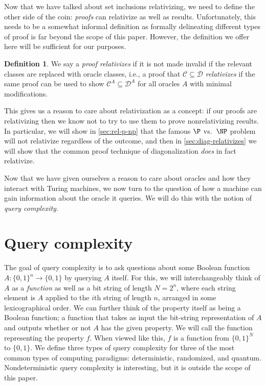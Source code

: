 \documentclass[english]{reedthesis}
\theoremstyle{plain}
\theoremstyle{definition}
\newtheorem{defn}[defn]{Definition}
\theoremstyle{remark}
\begin{document}
Now that we have talked about set inclusions relativizing, we need to define the
other side of the coin: \emph{proofs} can relativize as well as results.
Unfortunately, this needs to be a somewhat informal definition as formally
delineating different types of proof is far beyond the scope of this paper.
However, the definition we offer here will be sufficient for our purposes.

\begin{defn}\label{def:relativizing-result}
  We say a \emph{proof relativizes} if it is not made invalid if the relevant
  classes are replaced with oracle classes, i.e., a proof that $\mathcal{C} \subseteq \mathcal{D}$
  \emph{relativizes} if the same proof can be used to show $\mathcal{C}^{A} \subseteq \mathcal{D}^{A}$ for
  all oracles $A$ with minimal modifications.
\end{defn}

This gives us a reason to care about relativization as a concept: if our proofs
are relativizing then we know not to try to use them to prove nonrelativizing
results. In particular, we will show in \cref{sec:rel-p-np} that the famous $\P$
vs.\ $\NP$ problem will not relativize regardless of the outcome, and then in
\cref{sec:diag-relativizes} we will show that the common proof technique of
diagonalization \emph{does} in fact relativize.

Now that we have given ourselves a reason to care about oracles and how they
interact with Turing machines, we now turn to the question of how a machine can
gain information about the oracle it queries. We will do this with the notion of
\emph{query complexity}.

\section{Query complexity}\label{sec:query-complexity}

The goal of query complexity is to ask questions about some Boolean function
$A: \{0, 1\}^{n} \rightarrow \{0, 1\}$ by querying $A$ itself. For this, we will
interchangeably think of $A$ as a \emph{function} as well as a bit string of
length $N = 2^{n}$, where each string element is $A$ applied to the $i$th string
of length $n$, arranged in some lexicographical order. %
We can further think of the property itself as being a Boolean function; a
function that takes as input the bit-string representation of $A$ and outputs
whether or not $A$ has the given property. We will call the function
representing the property $f$. When viewed like this, $f$ is a function from
$\{0, 1\}^{N}$ to $\{0, 1\}$. We define three types of query complexity for
three of the most common types of computing paradigms: deterministic,
randomized, and quantum. Nondeterministic query complexity is interesting, but
it is outside the scope of this paper.
\end{document}
